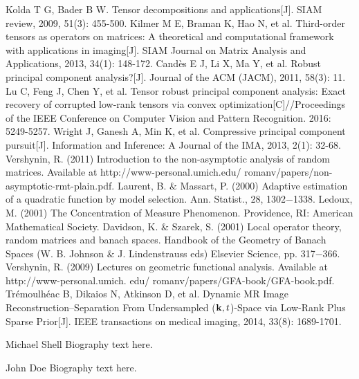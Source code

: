\documentclass[journal,transmag]{IEEEtran}
\theoremstyle{plain}
\begin{document}
\ifCLASSOPTIONcaptionsoff
  \newpage
\fi



\begin{thebibliography}{1}

Kolda T G, Bader B W. Tensor decompositions and applications[J]. SIAM review, 2009, 51(3): 455-500.
Kilmer M E, Braman K, Hao N, et al. Third-order tensors as operators on matrices: A theoretical and computational framework with applications in imaging[J]. SIAM Journal on Matrix Analysis and Applications, 2013, 34(1): 148-172.
Candès E J, Li X, Ma Y, et al. Robust principal component analysis?[J]. Journal of the ACM (JACM), 2011, 58(3): 11.
Lu C, Feng J, Chen Y, et al. Tensor robust principal component analysis: Exact recovery of corrupted low-rank tensors via convex optimization[C]//Proceedings of the IEEE Conference on Computer Vision and Pattern Recognition. 2016: 5249-5257.
Wright J, Ganesh A, Min K, et al. Compressive principal component pursuit[J]. Information and Inference: A Journal of the IMA, 2013, 2(1): 32-68.
Vershynin, R. (2011) Introduction to the
    non-asymptotic analysis of random matrices. Available at
http://www-personal.umich.edu/ romanv/papers/non-asymptotic-rmt-plain.pdf.
Laurent, B. $\&$ Massart, P. (2000) Adaptive estimation of a quadratic function by model selection. Ann. Statist., 28, 1302$-$1338.
Ledoux, M. (2001) The Concentration of Measure Phenomenon. Providence, RI: American Mathematical
Society.
Davidson, K. $\&$ Szarek, S. (2001) Local operator theory, random matrices and banach spaces. Handbook of
the Geometry of Banach Spaces (W. B. Johnson $\&$ J. Lindenstrauss eds) Elsevier Science, pp. 317$-$366.
Vershynin, R. (2009) Lectures on geometric functional analysis. Available at http://www-personal.umich.
edu/ romanv/papers/GFA-book/GFA-book.pdf.
 Trémoulhéac B, Dikaios N, Atkinson D, et al. Dynamic MR Image Reconstruction–Separation From Undersampled (${\bf k}, t $)-Space via Low-Rank Plus Sparse Prior[J]. IEEE transactions on medical imaging, 2014, 33(8): 1689-1701.
\end{thebibliography}

\begin{IEEEbiography}{Michael Shell}
Biography text here.
\end{IEEEbiography}

\begin{IEEEbiographynophoto}{John Doe}
Biography text here.
\end{IEEEbiographynophoto}
\end{document}

